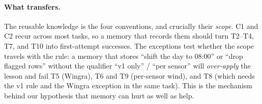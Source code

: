\paragraph{What transfers.} The reusable knowledge is the four conventions, and crucially
their \emph{scope}. C1 and C2 recur across most tasks, so a memory that records them
should turn T2--T4, T7, and T10 into first-attempt successes. The exceptions test whether
the scope travels with the rule: a memory that stores ``shift the day to 08:00'' or ``drop
flagged rows'' without the qualifier ``v1 only'' / ``per sensor'' will \emph{over-apply}
the lesson and fail T5 (Wingra), T6 and T9 (per-sensor wind), and T8 (which needs the v1
rule and the Wingra exception in the same task). This is the mechanism behind our
hypothesis that memory can hurt as well as help.
